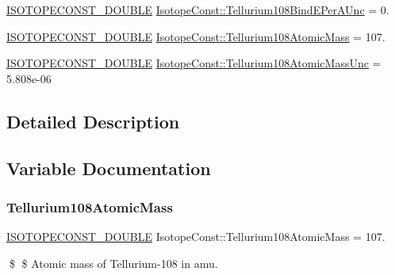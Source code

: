 \begin{DoxyCompactItemize}
\mbox{\hyperlink{group___isotope_const-_macros_ga8f45a7272ce02c0b4c65c44636ed719a}{I\+S\+O\+T\+O\+P\+E\+C\+O\+N\+S\+T\+\_\+\+D\+O\+U\+B\+LE}} \mbox{\hyperlink{group___isotope_const-_tellurium-_te108_gae9ef3e3796a9051dcb9913bd823df4d0}{Isotope\+Const\+::\+Tellurium108\+Bind\+E\+Per\+A\+Unc}} = 0.
\item 
\mbox{\hyperlink{group___isotope_const-_macros_ga8f45a7272ce02c0b4c65c44636ed719a}{I\+S\+O\+T\+O\+P\+E\+C\+O\+N\+S\+T\+\_\+\+D\+O\+U\+B\+LE}} \mbox{\hyperlink{group___isotope_const-_tellurium-_te108_ga8fa841869e2507bcd6955b9eedfbec73}{Isotope\+Const\+::\+Tellurium108\+Atomic\+Mass}} = 107.
\item 
\mbox{\hyperlink{group___isotope_const-_macros_ga8f45a7272ce02c0b4c65c44636ed719a}{I\+S\+O\+T\+O\+P\+E\+C\+O\+N\+S\+T\+\_\+\+D\+O\+U\+B\+LE}} \mbox{\hyperlink{group___isotope_const-_tellurium-_te108_ga0b7a0a40a32e3a596c5adc5fca293bc4}{Isotope\+Const\+::\+Tellurium108\+Atomic\+Mass\+Unc}} = 5.\+808e-\/06
\end{DoxyCompactItemize}


\subsection{Detailed Description}


\subsection{Variable Documentation}
\mbox{\label{group___isotope_const-_tellurium-_te108_ga8fa841869e2507bcd6955b9eedfbec73}} 
\subsubsection{\texorpdfstring{Tellurium108\+Atomic\+Mass}{Tellurium108AtomicMass}}
{\footnotesize\ttfamily \mbox{\hyperlink{group___isotope_const-_macros_ga8f45a7272ce02c0b4c65c44636ed719a}{I\+S\+O\+T\+O\+P\+E\+C\+O\+N\+S\+T\+\_\+\+D\+O\+U\+B\+LE}} Isotope\+Const\+::\+Tellurium108\+Atomic\+Mass = 107.}

\$ \$ Atomic mass of Tellurium-\/108 in amu. \mbox{\label{group___isotope_const-_tellurium-_te108_ga0b7a0a40a32e3a596c5adc5fca293bc4}} 
